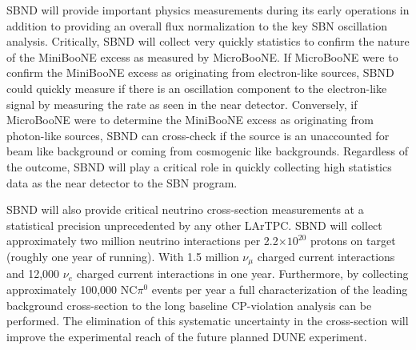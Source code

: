 SBND will provide important physics measurements during its early operations in addition to providing an overall flux normalization to the key SBN oscillation analysis. Critically, SBND will collect very quickly statistics to confirm the nature of the MiniBooNE excess as measured by MicroBooNE. If MicroBooNE were to confirm the MiniBooNE excess as originating from electron-like sources, SBND could quickly measure if there is an oscillation component to the electron-like signal by measuring the rate as seen in the near detector. Conversely, if MicroBooNE were to determine the MiniBooNE excess as originating from photon-like sources, SBND can cross-check if the source is an unaccounted for beam like background or coming from cosmogenic like backgrounds. Regardless of the outcome, SBND will play a critical role in quickly collecting high statistics data as the near detector to the SBN program.

SBND will also provide critical neutrino cross-section measurements at a statistical precision unprecedented by any other LArTPC. SBND will collect approximately two million neutrino interactions per 2.2$\times 10^{20}$ protons  on target (roughly one year of running). With 1.5 million $\nu_{\mu}$ charged current interactions and 12,000 $\nu_{e}$ charged current interactions in one year. Furthermore, by collecting approximately 100,000 NC$\pi^{0}$ events per year a full characterization of the leading background cross-section to the long baseline CP-violation analysis can be performed. The elimination of this systematic uncertainty in the cross-section will improve the experimental reach of the future planned DUNE experiment.

